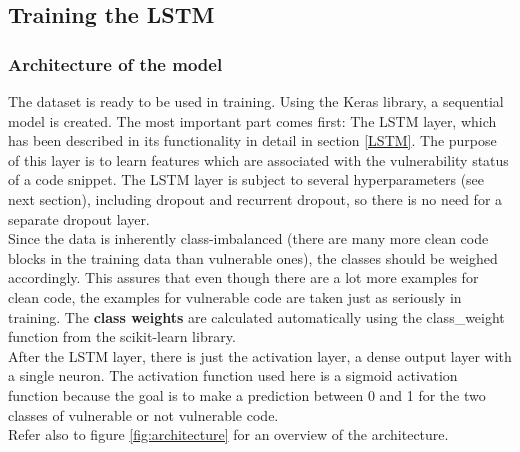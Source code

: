 \documentclass[
	a4paper,
	pagesize,
	pdftex,
	12pt,
	twoside, %
	BCOR=5mm, %
	ngerman,
	fleqn,
	final,
	]{scrartcl}
\begin{document}
\subsection{Training the LSTM}

\subsubsection{Architecture of the model}

The dataset is ready to be used in training. Using the Keras library, a sequential model is created. The most important part comes first: The LSTM layer, which has been described in its functionality in detail in section \ref{LSTM}. The purpose of this layer is to learn features which are associated with the vulnerability status of a code snippet. The LSTM layer is subject to several hyperparameters (see next section), including dropout and recurrent dropout, so there is no need for a separate dropout layer. \\
Since the data is inherently class-imbalanced (there are many more clean code blocks in the training data than vulnerable ones), the classes should be weighed accordingly. This assures that even though there are a lot more examples for clean code, the examples for vulnerable code are taken just as seriously in training. The \textbf{class weights} are calculated automatically using the class\_weight function from the scikit-learn library.\\
After the LSTM layer, there is just the activation layer, a dense output layer with a single neuron. The activation function used here is a sigmoid activation function because the goal is to make a prediction between 0 and 1 for the two classes of vulnerable or not vulnerable code.\\
Refer also to figure \ref{fig:architecture} for an overview of the architecture.
\end{document}
